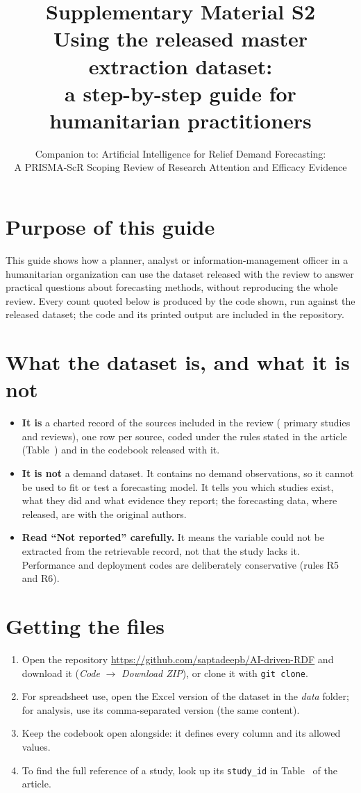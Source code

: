 \documentclass[11pt,a4paper]{article}
\title{\textbf{Supplementary Material S2}\\[4pt]
\large Using the released master extraction dataset:\\ a step-by-step guide for humanitarian practitioners}
\author{\normalsize Companion to: Artificial Intelligence for Relief Demand Forecasting:\\ \normalsize A PRISMA-ScR Scoping Review of Research Attention and Efficacy Evidence}
\date{}
\begin{document}
\maketitle

\section*{Purpose of this guide}
This guide shows how a planner, analyst or information-management officer in a humanitarian organization can use the dataset released with the review to answer practical questions about forecasting methods, without reproducing the whole review. Every count quoted below is produced by the code shown, run against the released dataset; the code and its printed output are included in the repository.

\section{What the dataset is, and what it is not}
\begin{itemize}[leftmargin=*]
\item \textbf{It is} a charted record of the \Nall{} sources included in the review (\Nprim{} primary studies and \Nrev{} reviews), one row per source, coded under the rules stated in the article (Table~\Xtabcodingrules) and in the codebook released with it.
\item \textbf{It is not} a demand dataset. It contains no demand observations, so it cannot be used to fit or test a forecasting model. It tells you which studies exist, what they did and what evidence they report; the forecasting data, where released, are with the original authors.
\item \textbf{Read ``Not reported'' carefully.} It means the variable could not be extracted from the retrievable record, not that the study lacks it. Performance and deployment codes are deliberately conservative (rules R5 and R6).
\end{itemize}

\section{Getting the files}
\begin{enumerate}[leftmargin=*]
\item Open the repository \url{https://github.com/saptadeepb/AI-driven-RDF} and download it (\emph{Code} $\rightarrow$ \emph{Download ZIP}), or clone it with \texttt{git clone}.
\item For spreadsheet use, open the Excel version of the dataset in the \emph{data} folder; for analysis, use its comma-separated version (the same content).
\item Keep the codebook open alongside: it defines every column and its allowed values.
\item To find the full reference of a study, look up its \texttt{study\_id} in Table~\Xtabincludedstudies{} of the article.
\end{enumerate}
\end{document}
